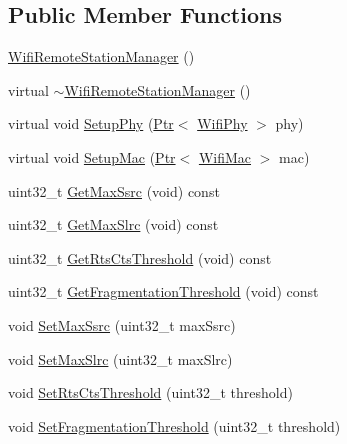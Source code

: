 \subsection*{Public Member Functions}
\begin{DoxyCompactItemize}
\item 
\hyperlink{classns3_1_1WifiRemoteStationManager_a78524840f5900e1937e8e2d6df48954d}{Wifi\+Remote\+Station\+Manager} ()
\item 
virtual \hyperlink{classns3_1_1WifiRemoteStationManager_adf817ed0d40e3c53a8d0fbb5dfd24388}{$\sim$\+Wifi\+Remote\+Station\+Manager} ()
\item 
virtual void \hyperlink{classns3_1_1WifiRemoteStationManager_a823deffface82c9fe1daa06ce11c585b}{Setup\+Phy} (\hyperlink{classns3_1_1Ptr}{Ptr}$<$ \hyperlink{classns3_1_1WifiPhy}{Wifi\+Phy} $>$ phy)
\item 
virtual void \hyperlink{classns3_1_1WifiRemoteStationManager_a4e9a526ceb0023999870799817a06bb2}{Setup\+Mac} (\hyperlink{classns3_1_1Ptr}{Ptr}$<$ \hyperlink{classns3_1_1WifiMac}{Wifi\+Mac} $>$ mac)
\item 
uint32\+\_\+t \hyperlink{classns3_1_1WifiRemoteStationManager_abf24be24fbb06445a377acd55bca3016}{Get\+Max\+Ssrc} (void) const 
\item 
uint32\+\_\+t \hyperlink{classns3_1_1WifiRemoteStationManager_af4092e2dba0a43c7fd7a91afa37c9fb3}{Get\+Max\+Slrc} (void) const 
\item 
uint32\+\_\+t \hyperlink{classns3_1_1WifiRemoteStationManager_a0b75b7a9caa37975939cf718442a2330}{Get\+Rts\+Cts\+Threshold} (void) const 
\item 
uint32\+\_\+t \hyperlink{classns3_1_1WifiRemoteStationManager_abad06c4d54951902f7ec20d26e3b4a98}{Get\+Fragmentation\+Threshold} (void) const 
\item 
void \hyperlink{classns3_1_1WifiRemoteStationManager_aa88ee92e80145998f7f825e24bfd52d0}{Set\+Max\+Ssrc} (uint32\+\_\+t max\+Ssrc)
\item 
void \hyperlink{classns3_1_1WifiRemoteStationManager_af9bf74dff1a083929967fd324d17c4c0}{Set\+Max\+Slrc} (uint32\+\_\+t max\+Slrc)
\item 
void \hyperlink{classns3_1_1WifiRemoteStationManager_a2775597e5f338539ee99d12760df5d31}{Set\+Rts\+Cts\+Threshold} (uint32\+\_\+t threshold)
\item 
void \hyperlink{classns3_1_1WifiRemoteStationManager_a8888e6f14a2a845b98b9b3b5c85d17a8}{Set\+Fragmentation\+Threshold} (uint32\+\_\+t threshold)
\item 

\end{DoxyCompactItemize}
